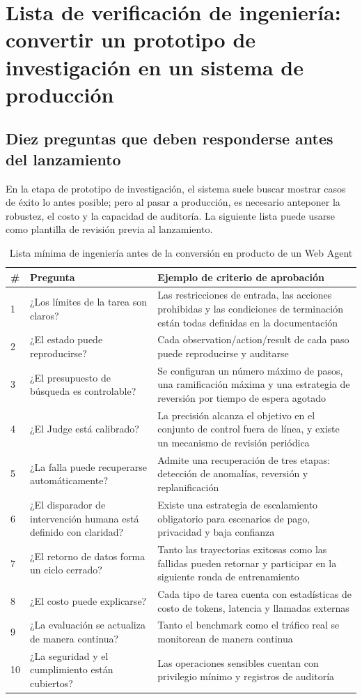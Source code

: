 \section{Lista de verificación de ingeniería: convertir un prototipo de investigación en un sistema de producción}

\subsection{Diez preguntas que deben responderse antes del lanzamiento}
En la etapa de prototipo de investigación, el sistema suele buscar mostrar casos de éxito lo antes posible; pero al pasar a producción, es necesario anteponer la robustez, el costo y la capacidad de auditoría. La siguiente lista puede usarse como plantilla de revisión previa al lanzamiento.

\begin{table}[H]
\centering
\small
\begin{tabular}{p{0.8cm}p{3.9cm}p{5.8cm}}
\toprule
\textbf{\#} & \textbf{Pregunta} & \textbf{Ejemplo de criterio de aprobación} \\
\midrule
1 & ¿Los límites de la tarea son claros? & Las restricciones de entrada, las acciones prohibidas y las condiciones de terminación están todas definidas en la documentación \\
2 & ¿El estado puede reproducirse? & Cada observation/action/result de cada paso puede reproducirse y auditarse \\
3 & ¿El presupuesto de búsqueda es controlable? & Se configuran un número máximo de pasos, una ramificación máxima y una estrategia de reversión por tiempo de espera agotado \\
4 & ¿El Judge está calibrado? & La precisión alcanza el objetivo en el conjunto de control fuera de línea, y existe un mecanismo de revisión periódica \\
5 & ¿La falla puede recuperarse automáticamente? & Admite una recuperación de tres etapas: detección de anomalías, reversión y replanificación \\
6 & ¿El disparador de intervención humana está definido con claridad? & Existe una estrategia de escalamiento obligatorio para escenarios de pago, privacidad y baja confianza \\
7 & ¿El retorno de datos forma un ciclo cerrado? & Tanto las trayectorias exitosas como las fallidas pueden retornar y participar en la siguiente ronda de entrenamiento \\
8 & ¿El costo puede explicarse? & Cada tipo de tarea cuenta con estadísticas de costo de tokens, latencia y llamadas externas \\
9 & ¿La evaluación se actualiza de manera continua? & Tanto el benchmark como el tráfico real se monitorean de manera continua \\
10 & ¿La seguridad y el cumplimiento están cubiertos? & Las operaciones sensibles cuentan con privilegio mínimo y registros de auditoría \\
\bottomrule
\end{tabular}
\caption{Lista mínima de ingeniería antes de la conversión en producto de un Web Agent}
\end{table}

